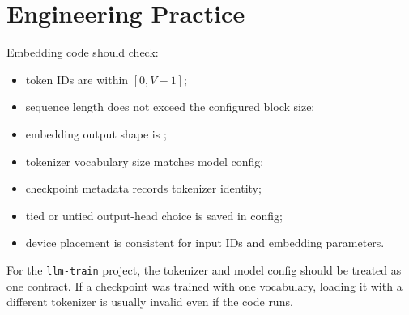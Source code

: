 \begin{center}
\end{center}

\section{Engineering Practice}

Embedding code should check:

\begin{itemize}
  \item token IDs are within \([0,V-1]\);
  \item sequence length does not exceed the configured block size;
  \item embedding output shape is \shape{[B,T,C]};
  \item tokenizer vocabulary size matches model config;
  \item checkpoint metadata records tokenizer identity;
  \item tied or untied output-head choice is saved in config;
  \item device placement is consistent for input IDs and embedding parameters.
\end{itemize}

For the \texttt{llm-train} project, the tokenizer and model config should be treated as one contract. If a checkpoint was trained with one vocabulary, loading it with a different tokenizer is usually invalid even if the code runs.

